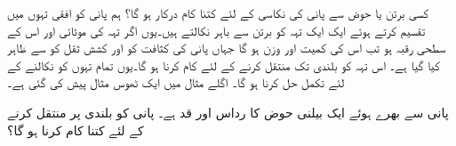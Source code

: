 کسی برتن یا حوض سے پانی کی نکاسی کے لئے کتنا کام درکار ہو گا؟ ہم پانی کو افقی تہوں میں تقسیم کرتے ہوئے ایک ایک تہہ کو برتن سے باہر نکالتے ہیں۔یوں اگر تہہ کی موٹائی  اور اس کے سطحی رقبہ  ہو تب اس کی کمیت  اور وزن  ہو گا جہاں پانی کی کثافت کو  اور کشش ثقل کو  سے ظاہر کیا گیا ہے۔ اس تہہ کو بلندی  تک منتقل کرنے کے لئے  کام کرنا ہو گا۔یوں تمام تہوں کو نکالنے کے لئے تکمل حل کرنا ہو گا۔  اگلے مثال میں ایک ٹھوس مثال پیش کی گئی ہے۔

پانی سے بھرے ہوئے ایک بیلنی حوض کا رداس  اور قد  ہے۔ پانی کو  بلندی پر منتقل کرنے کے لئے کتنا کام کرنا ہو گا؟

